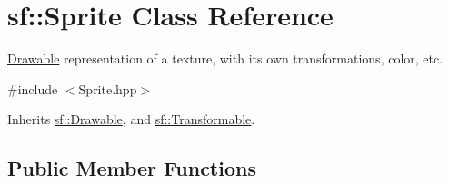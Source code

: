 \hypertarget{classsf_1_1_sprite}{\section{sf\+:\+:Sprite Class Reference}
\label{classsf_1_1_sprite}
}


\hyperlink{classsf_1_1_drawable}{Drawable} representation of a texture, with its own transformations, color, etc.  




{\ttfamily \#include $<$Sprite.\+hpp$>$}



Inherits \hyperlink{classsf_1_1_drawable}{sf\+::\+Drawable}, and \hyperlink{classsf_1_1_transformable}{sf\+::\+Transformable}.

\subsection*{Public Member Functions}
